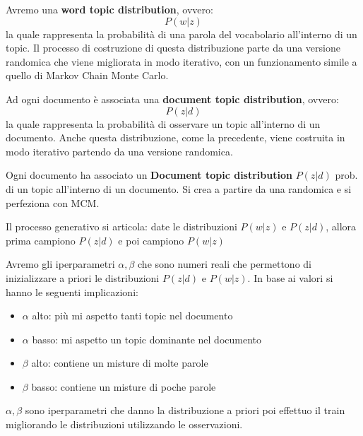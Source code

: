 Avremo una \textbf{word topic distribution}, ovvero:
\begin{equation*}
      P(w|z)
\end{equation*}
la quale rappresenta la probabilità di una parola del vocabolario all'interno di
un topic. Il processo di costruzione di questa distribuzione parte da una versione
randomica che viene migliorata in modo iterativo, con un funzionamento simile a
quello di Markov Chain Monte Carlo.

Ad ogni documento è associata una \textbf{document topic distribution}, ovvero:
\begin{equation*}
      P(z|d)
\end{equation*}
la quale rappresenta la probabilità di osservare un topic all'interno di un documento.
Anche questa distribuzione, come la precedente, viene costruita in modo iterativo
partendo da una versione randomica.

Ogni documento ha associato un \textbf{Document topic distribution} $P(z|d)$ prob. di un topic
all'interno di un documento. Si crea a partire da una randomica e si perfeziona con
MCM.

Il processo generativo si articola: date le distribuzioni $P(w|z)$ e $P(z|d)$, allora prima campiono
$P(z|d)$ e poi campiono $P(w|z)$

Avremo gli iperparametri $\alpha, \beta$ che sono numeri reali che permettono
di inizializzare a priori le distribuzioni $P(z|d)$ e $P(w|z)$. In base ai valori
si hanno le seguenti implicazioni:
\begin{itemize}
      \item $\alpha$ alto: più mi aspetto tanti topic nel documento
      \item $\alpha$ basso: mi aspetto un topic dominante nel documento
      \item $\beta$ alto: contiene un misture di molte parole
      \item $\beta$ basso: contiene un misture di poche parole
\end{itemize}

$\alpha, \beta$ sono iperparametri che danno la distribuzione a priori poi effettuo
il train migliorando le distribuzioni utilizzando le osservazioni.

